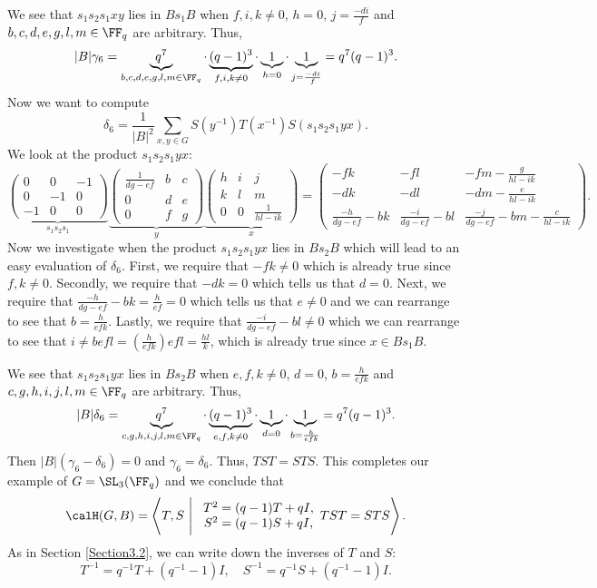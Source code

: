 \documentclass[11pt]{amsart}
\theoremstyle{remark}
\begin{document}
We see that $s_1s_2s_1xy$ lies in $Bs_1B$ when $f,i,k\neq 0$, $h=0$, $j=\frac{-di}{f}$ and $b,c,d,e,g,l,m\in\FF_q$ are arbitrary.
Thus,
\[
	|B|\gamma_6 = \underbrace{q^7}_{b,c,d,e,g,l,m\in\FF_q}\cdot\underbrace{(q-1)^3}_{f,i,k\neq 0}\cdot \underbrace{1}_{h=0}\cdot \underbrace{1}_{j=\frac{-di}{f}} = q^7(q-1)^3.
\]
Now we want to compute
\[
	\delta_6 = \frac{1}{|B|^2}\sum_{x,y\in G} S(y^{-1})T(x^{-1})S(s_1s_2s_1yx).
\]
We look at the product $s_1s_2s_1yx$:
\[
	\underbrace{\begin{pmatrix}
			0  & 0  & -1 \\
			0  & -1 & 0  \\
			-1 & 0  & 0
		\end{pmatrix}}_{s_1s_2s_1}
	\underbrace{\begin{pmatrix}
			\frac{1}{dg-ef} & b & c \\
			0               & d & e \\
			0               & f & g
		\end{pmatrix}}_{y}
	\underbrace{\begin{pmatrix}
			h & i & j               \\
			k & l & m               \\
			0 & 0 & \frac{1}{hl-ik}
		\end{pmatrix}}_{x}
	=
	\begin{pmatrix}
		-fk                 & -fl                   & -fm-\frac{g}{hl-ik}                 \\
		-dk                 & -dl                   & -dm-\frac{e}{hl-ik}                 \\
		\frac{-h}{dg-ef}-bk & \frac{-i}{dg-ef} - bl & \frac{-j}{dg-ef}-bm-\frac{c}{hl-ik}
	\end{pmatrix}.
\]
Now we investigate when the product $s_1s_2s_1yx$ lies in $Bs_2B$ which will lead to an easy evaluation of $\delta_6$.
First, we require that $-fk\neq 0$ which is already true since $f,k\neq 0$.
Secondly, we require that $-dk=0$ which tells us that $d=0$.
Next, we require that $\frac{-h}{dg-ef}-bk=\frac{h}{ef}=0$ which tells us that $e\neq 0$ and we can rearrange to see that $b=\frac{h}{efk}$.
Lastly, we require that $\frac{-i}{dg-ef}-bl\neq 0$ which we can rearrange to see that $i\neq befl = (\frac{h}{efk})efl = \frac{hl}{k}$, which is already true since $x\in Bs_1B$.

We see that $s_1s_2s_1yx$ lies in $Bs_2B$ when $e,f,k\neq 0$, $d=0$, $b=\frac{h}{efk}$ and $c,g,h,i,j,l,m\in\FF_q$ are arbitrary.
Thus,
\[
	|B|\delta_6 = \underbrace{q^7}_{c,g,h,i,j,l,m\in\FF_q}\cdot\underbrace{(q-1)^3}_{e,f,k\neq 0}\cdot \underbrace{1}_{d=0}\cdot \underbrace{1}_{b=\frac{h}{efk}}  = q^7(q-1)^3.
\]
Then $|B|(\gamma_6-\delta_6)=0$ and $\gamma_6=\delta_6$.
Thus, $TST=STS$.
This completes our example of $G=\SL_3(\FF_q)$ and we conclude that
\[
	\calH(G,B) = \left\langle T,S\ \Bigg|\ \begin{array}{c}
		T^2 = (q-1)T + qI, \\
		S^2=(q-1)S+qI,
	\end{array}TST=STS\right\rangle.
\]
As in Section \ref{Section3.2}, we can write down the inverses of $T$ and $S$:
\[
	T^{-1} = q^{-1}T + (q^{-1}-1)I,\quad S^{-1} = q^{-1}S + (q^{-1}-1)I.
\]
\end{document}
